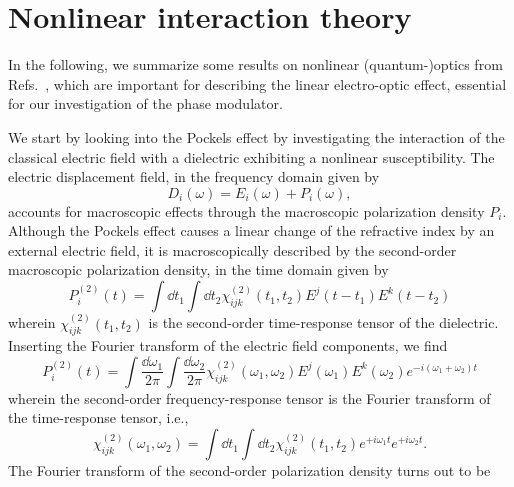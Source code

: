 \chapter{Nonlinear interaction theory}\label{app:macroscopic_interactions}

In the following, we summarize some results on nonlinear (quantum-)optics from Refs.~\cite{Murti2014,Boyd2020,QuesadaMejia2015,Mandel1995}, which are important for describing the linear electro-optic effect, essential for our investigation of the phase modulator.

We start by looking into the Pockels effect by investigating the interaction of the classical electric field with a dielectric exhibiting a nonlinear susceptibility.
The electric displacement field, in the frequency domain given by~\cite[p.~1070]{Mandel1995}
\begin{equation}
	D_i(\omega)
	=
	E_i(\omega)
	+
	P_i(\omega)
	,
	\label{eq:electric_displacement_field}
\end{equation}
accounts for macroscopic effects through the macroscopic polarization density $P_i$.
Although the Pockels effect causes a linear change of the refractive index by an external electric field, it is macroscopically described by the second-order macroscopic polarization density, in the time domain given by~\cite[p.~55]{Boyd2020}
\begin{equation}
	P_i^{(2)}(t)
	=
	\int\dd{t_1}
	\int\dd{t_2}
	\chi^{(2)}_{ijk}(t_1,t_2)
	E^j(t-t_1)
	E^k(t-t_2)
	\label{eq:polarization_density_so_time}
\end{equation}
wherein $\chi^{(2)}_{ijk}(t_1,t_2)$ is the second-order time-response tensor of the dielectric.
Inserting the Fourier transform of the electric field components, we find
\begin{equation}
	P_i^{(2)}(t)
	=
	\int\frac{\dd{\omega_1}}{2\pi}
	\int\frac{\dd{\omega_2}}{2\pi}
	\chi^{(2)}_{ijk}(\omega_1,\omega_2)
	E^j(\omega_1)
	E^k(\omega_2)
	e^{-i(\omega_1+\omega_2)t}
	\label{eq:polarization_density_so_time_fourier}
\end{equation}
wherein the second-order frequency-response tensor is the Fourier transform of the time-response tensor, i.e.,
\begin{equation}
	\chi^{(2)}_{ijk}(\omega_1,\omega_2)
	=
	\int\dd{t_1}
	\int\dd{t_2}
	\chi^{(2)}_{ijk}(t_1,t_2)
	e^{+i\omega_1t}
	e^{+i\omega_2t}
	.
\end{equation}
The Fourier transform of the second-order polarization density turns out to be
